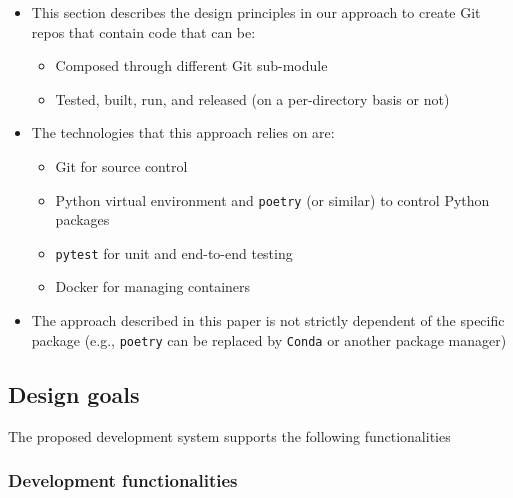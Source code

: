 \documentclass{article}
\begin{document}
\begin{itemize}

  \item This section describes the design principles in our approach to create Git
    repos that contain code that can be:

    \begin{itemize}

      \item Composed through different Git sub-module

      \item Tested, built, run, and released (on a per-directory basis or not)
    \end{itemize}

  \item The technologies that this approach relies on are:

    \begin{itemize}

      \item Git for source control

      \item Python virtual environment and \texttt{poetry} (or similar) to
        control Python packages

      \item \texttt{pytest} for unit and end-to-end testing

      \item Docker for managing containers
    \end{itemize}

  \item The approach described in this paper is not strictly dependent of the specific
    package (e.g., \texttt{poetry} can be replaced by \texttt{Conda} or another
    package manager)
\end{itemize}

\subsection{Design goals}

The proposed development system supports the following functionalities

\subsubsection{Development functionalities}
\end{document}
